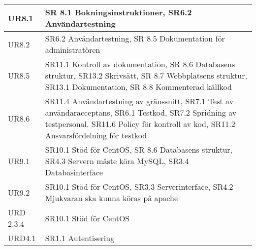 \documentclass[a4paper, twoside, 11pt, titlepage]{article}
\begin{document}
\begin{tabular} { p{2.6cm} p{12.5cm} }
	\hline
	UR8.1 & SR 8.1 Bokningsinstruktioner, SR6.2 Användartestning  \\
	\hline
	UR8.2 & SR6.2 Användartestning, SR 8.5 Dokumentation för administratören  \\
	\hline
	UR8.5 & SR11.1 Kontroll av dokumentation, SR 8.6 Databasens struktur, SR13.2 Skrivsätt, SR 8.7 Webbplatsens struktur, SR13.1 Dokumentation, SR 8.8 Kommenterad källkod  \\
	\hline
	UR8.6 & SR11.4 Användartestning av gränssnitt, SR7.1 Test av användaracceptans, SR6.1 Testkod, SR7.2 Spridning av testpersonal, SR11.6 Policy för kontroll av kod, SR11.2 Ansvarsfördelning för testkod  \\
	\hline
	UR9.1 & SR10.1 Stöd för CentOS, SR 8.6 Databasens struktur, SR4.3 Servern måste köra MySQL, SR3.4 Databasinterface  \\
	\hline
	UR9.2 & SR10.1 Stöd för CentOS, SR3.3 Serverinterface, SR4.2 Mjukvaran ska kunna köras på apache  \\
	\hline
	URD 2.3.4 & SR10.1 Stöd för CentOS  \\
	\hline
	URD4.1 & SR1.1 Autentisering  \\
	\hline
\end{tabular}


\clearpage
	\appendix
\end{document}
